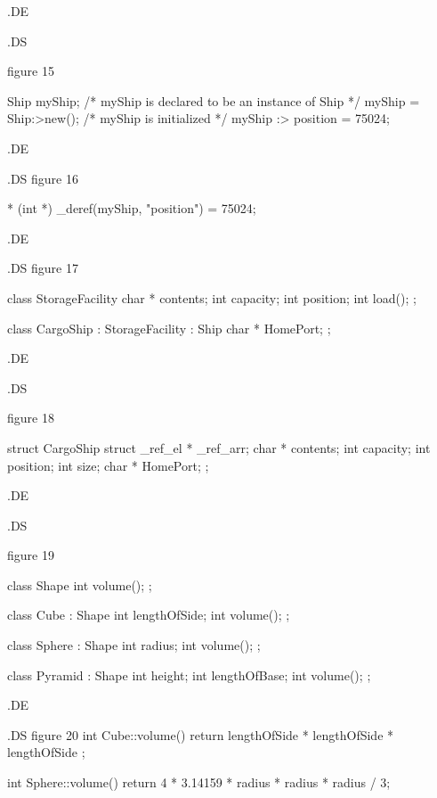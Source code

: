 .DE






.DS

figure 15

Ship	myShip;		/* myShip is declared to be an instance of Ship */ 
myShip = Ship:>new();	/* myShip is initialized */
myShip :> position = 75024;


.DE






.DS
figure 16

* (int *) _deref(myShip, "position") = 75024;

.DE





.DS
figure 17

class StorageFacility
    {
	char *	contents;
	int	capacity;
	int	position;
	int	load();
    }	;

class CargoShip : StorageFacility : Ship
    {
	char *	HomePort;
    }	;

.DE







.DS

figure 18

struct CargoShip
    {
	struct _ref_el * _ref_arr;
	char *	contents;
	int	capacity;
	int	position;
	int	size;
	char *	HomePort;
    }	;


.DE





.DS

figure 19

class Shape
    {
	int volume();
    }	;


class Cube : Shape
    {
	int	lengthOfSide;
	int	volume();
    }	;

class Sphere : Shape
    {
	int	radius;
	int	volume();
    }	;

class Pyramid : Shape
    {
	int	height;
	int	lengthOfBase;
	int	volume();
    }	;



.DE






.DS
figure 20
int Cube::volume()
{ return lengthOfSide * lengthOfSide * lengthOfSide ; }

int Sphere::volume()
{ return 4 * 3.14159 * radius * radius * radius / 3; }

